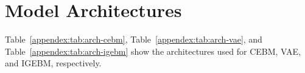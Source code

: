 



% 


% 
\newpage
\onecolumn
{}
\appendix
\section{Model Architectures}
\label{appendix-architectures}
Table~\ref{appendex:tab:arch-cebm}, Table~\ref{appendex:tab:arch-vae}, and Table~\ref{appendex:tab:arch-igebm} show the architectures used for CEBM, VAE, and IGEBM, respectively.

